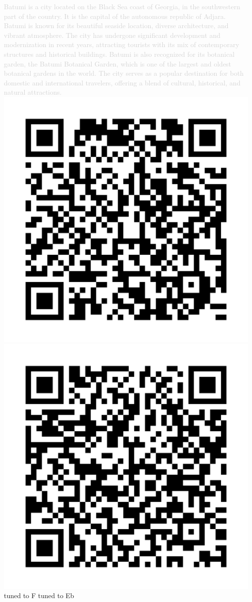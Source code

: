 \textcolor{lightgray}{Batumi is a city located on the Black Sea coast of Georgia, in the southwestern part of the country. It is the capital of the autonomous republic of Adjara. Batumi is known for its beautiful seaside location, diverse architecture, and vibrant atmosphere. The city has undergone significant development and modernization in recent years, attracting tourists with its mix of contemporary structures and historical buildings.
Batumi is also recognized for its botanical garden, the Batumi Botanical Garden, which is one of the largest and oldest botanical gardens in the world. The city serves as a popular destination for both domestic and international travelers, offering a blend of cultural, historical, and natural attractions.}\\

\includegraphics[width=0.2\linewidth]{QR_Codes/QR_DieReiseNachBatumi_F.png}\indent \indent \indent \indent \indent \indent \indent \indent \indent \indent \indent \indent
\includegraphics[width=0.2\linewidth]{QR_Codes/QR_DieReiseNachBatumi_Eb.png}\\
\indent\indent tuned to F \indent \indent \indent \indent \indent \indent \indent \indent \indent \indent \indent \indent \indent tuned to Eb
